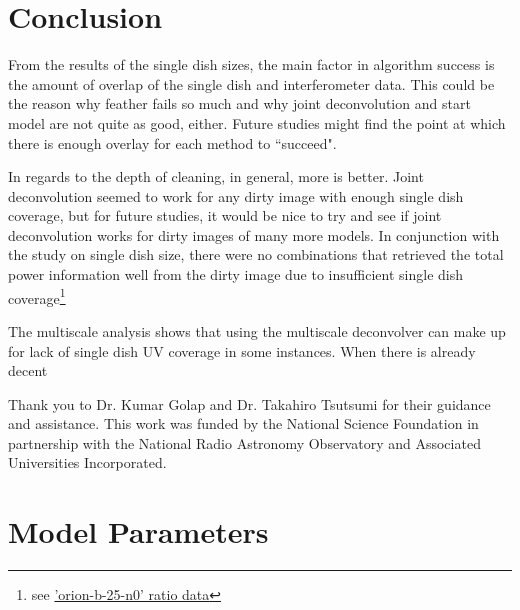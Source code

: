 \documentclass[manuscript,linenumbers]{aastex62}
\begin{document}
\section{Conclusion}

From the results of the single dish sizes, the main factor in algorithm success is the amount of overlap of the single dish and interferometer data. This could be the reason why feather fails so much and why joint deconvolution and start model are not quite as good, either. Future studies might find the point at which there is enough overlay for each method to ``succeed". 

In regards to the depth of cleaning, in general, more is better. Joint deconvolution seemed to work for any dirty image with enough single dish coverage, but for future studies, it would be nice to try and see if joint deconvolution works for dirty images of many more models. In conjunction with the study on single dish size, there were no combinations that retrieved the total power information well from the dirty image due to insufficient single dish coverage\footnote{see \href{https://gitlab.com/mileslucas/rica/blob/master/docs/static/ratios/orion-b-25-n0__model.csv}{'orion-b-25-n0' ratio data}}

The multiscale analysis shows that using the multiscale deconvolver can make up for lack of single dish UV coverage in some instances. When there is already decent 




\acknowledgments
Thank you to Dr. Kumar Golap and Dr. Takahiro Tsutsumi for their guidance and assistance. This work was funded by the National Science Foundation in partnership with the National Radio Astronomy Observatory and Associated Universities Incorporated.




\appendix
\section{Model Parameters}
\label{sec:models}
\end{document}
